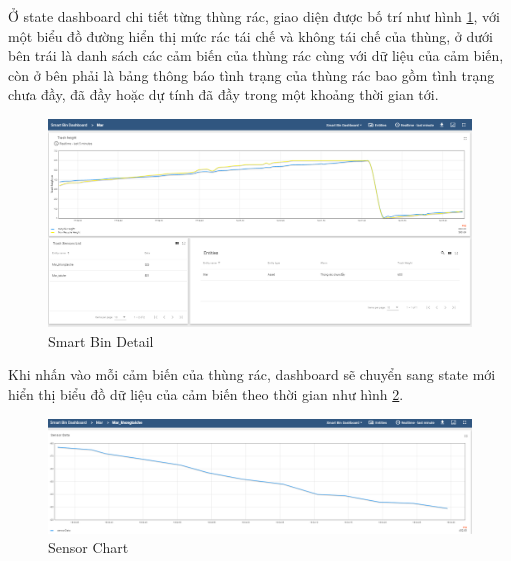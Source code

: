 Ở state dashboard chi tiết từng thùng rác, giao diện được bố trí như hình \ref{fig:bin_detail}, với một biểu đồ đường hiển thị mức rác tái chế và không tái chế của thùng, ở dưới bên trái là danh sách các cảm biến của thùng rác cùng với dữ liệu của cảm biến, còn ở bên phải là bảng thông báo tình trạng của thùng rác bao gồm tình trạng chưa đầy, đã đầy hoặc dự tính đã đầy trong một khoảng thời gian tới. 
\begin{figure}[H]
    \centering
    \includegraphics[width=\textwidth]{images/Khanh/Thingsboard/Bin_detail.PNG}
    \caption{Smart Bin Detail}
    \label{fig:bin_detail}
\end{figure}

Khi nhấn vào mỗi cảm biến của thùng rác, dashboard sẽ chuyển sang state mới hiển thị biểu đồ dữ liệu của cảm biến theo thời gian như hình \ref{fig:sensor_detail}.
\begin{figure}[H]
    \centering
    \includegraphics[width=\textwidth]{images/Khanh/Thingsboard/Sensor_detail.PNG}
    \caption{Sensor Chart}
    \label{fig:sensor_detail}
\end{figure}